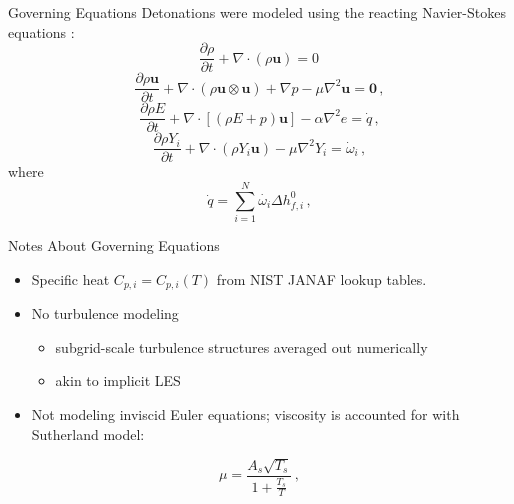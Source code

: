 \begin{frame}[allowframebreaks]{Governing Equations}
Detonations were modeled using the reacting Navier-Stokes equations \cite{kuo,stokes}:
\begin{equation}
\frac{\partial \rho}{\partial t} + \nabla \cdot \left(\rho \bm{u}\right) = 0\,
\end{equation}
\begin{equation}
\frac{\partial \rho\bm{u}}{\partial t} + \nabla \cdot \left(\rho \bm{u}\otimes \bm{u}\right) + \nabla p -\mu\nabla^2\bm{u}= \bm{0}\,,
\end{equation}
\begin{equation}
\frac{\partial \rho E}{\partial t} + \nabla \cdot \left[\left(\rho E + p\right)\bm{u}\right] -\alpha\nabla^2 e = \dot{q}\,,
\end{equation}
\begin{equation}
\frac{\partial \rho Y_i}{\partial t} + \nabla \cdot \left(\rho Y_i \bm{u}\right) -\mu\nabla^2 Y_i= \dot{\omega}_i\,,
\end{equation}
where 
\begin{equation}
\dot{q} = \sum_{i = 1}^N \dot{\omega_i} \Delta h_{f,i}^0\,,
\end{equation}
\end{frame}


\begin{frame}{Notes About Governing Equations}
\begin{itemize}
\item Specific heat $C_{p,i}=C_{p,i}(T)$ from NIST JANAF \cite{janaf} lookup tables.  
\item No turbulence modeling 
\begin{itemize}
    \item subgrid-scale turbulence structures averaged out numerically
    \item akin to implicit LES
\end{itemize}
\item Not modeling inviscid Euler equations; viscosity is accounted for with Sutherland \cite{sutherland} model:
\end{itemize}
\begin{equation}
\mu = \frac{A_s \sqrt{T_s}}{1 + \frac{T_s}{T}} \,,
\end{equation}
\end{frame}

